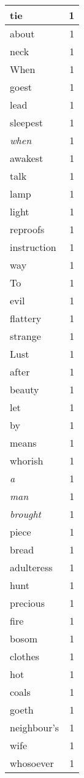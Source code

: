 \begin{center}
\begin{longtable}{l|r}
tie & 1\\ \hline 
about & 1\\ \hline 
neck & 1\\ \hline 
When & 1\\ \hline 
goest & 1\\ \hline 
lead & 1\\ \hline 
sleepest & 1\\ \hline 
\emph{when} & 1\\ \hline 
awakest & 1\\ \hline 
talk & 1\\ \hline 
lamp & 1\\ \hline 
light & 1\\ \hline 
reproofs & 1\\ \hline 
instruction & 1\\ \hline 
way & 1\\ \hline 
To & 1\\ \hline 
evil & 1\\ \hline 
flattery & 1\\ \hline 
strange & 1\\ \hline 
Lust & 1\\ \hline 
after & 1\\ \hline 
beauty & 1\\ \hline 
let & 1\\ \hline 
by & 1\\ \hline 
means & 1\\ \hline 
whorish & 1\\ \hline 
\emph{a} & 1\\ \hline 
\emph{man} & 1\\ \hline 
\emph{brought} & 1\\ \hline 
piece & 1\\ \hline 
bread & 1\\ \hline 
adulteress & 1\\ \hline 
hunt & 1\\ \hline 
precious & 1\\ \hline 
fire & 1\\ \hline 
bosom & 1\\ \hline 
clothes & 1\\ \hline 
hot & 1\\ \hline 
coals & 1\\ \hline 
goeth & 1\\ \hline 
neighbour's & 1\\ \hline 
wife & 1\\ \hline 
whosoever & 1\\ \hline 

\end{longtable}
\end{center}
